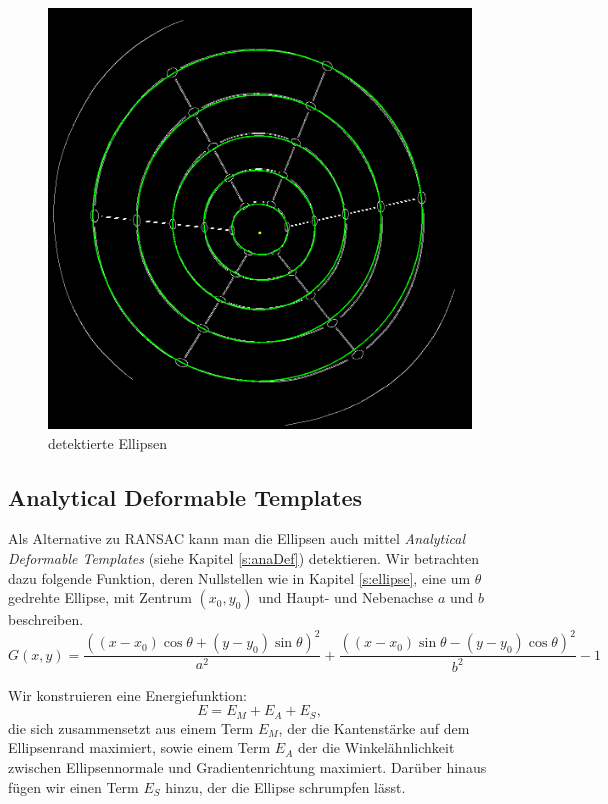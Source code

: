 \begin{figure}[!htb]
	\centering
	\includegraphics[scale=.25]{images/detectedEllipses.png}
	\caption{detektierte Ellipsen}
	\label{fig:detectedEllipses}
\end{figure}


\subsection{Analytical Deformable Templates}

Als Alternative zu RANSAC kann man die Ellipsen auch mittel \textit{Analytical Deformable Templates} (siehe Kapitel \ref{s:anaDef}) detektieren. Wir betrachten dazu folgende Funktion, deren Nullstellen wie in Kapitel \ref{s:ellipse}, eine um $\theta$ gedrehte Ellipse, mit Zentrum $(x_0,y_0)$ und Haupt- und Nebenachse $a$ und $b$ beschreiben. 
\begin{equation*}
	G(x,y) = \frac{((x - x_0)\cos\theta + (y - y_0)\sin\theta)^2}{a^2} + \frac{((x - x_0)\sin\theta - (y - y_0)\cos\theta)^2}{b^2} - 1
\end{equation*}

Wir konstruieren eine Energiefunktion:
\begin{equation*}
	E = E_M + E_A + E_S,
\end{equation*}
die sich zusammensetzt aus einem Term $E_M$, der die Kantenstärke auf dem Ellipsenrand maximiert, sowie einem Term $E_A$ der die Winkelähnlichkeit zwischen Ellipsennormale und Gradientenrichtung maximiert. Darüber hinaus fügen wir einen Term $E_S$ hinzu, der die Ellipse schrumpfen lässt. 


